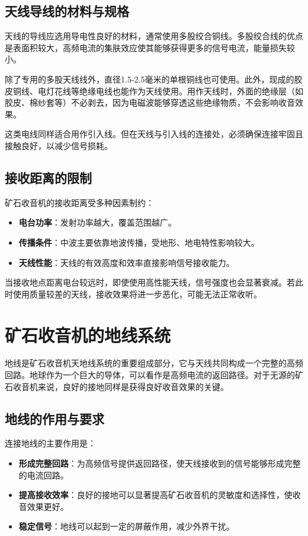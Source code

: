 \documentclass[12pt,UTF8]{ctexbook}
\begin{document}
\section{天线导线的材料与规格}

天线的导线应选用导电性良好的材料，通常使用多股绞合铜线。多股绞合线的优点是表面积较大，高频电流的集肤效应使其能够获得更多的信号电流，能量损失较小。

除了专用的多股天线线外，直径1.5-2.5毫米的单根铜线也可使用。此外，现成的胶皮铜线、电灯花线等绝缘电线也能作为天线使用。用作天线时，外面的绝缘层（如胶皮、棉纱套等）不必剥去，因为电磁波能够穿透这些绝缘物质，不会影响收音效果。

这类电线同样适合用作引入线。但在天线与引入线的连接处，必须确保连接牢固且接触良好，以减少信号损耗。

\section{接收距离的限制}

矿石收音机的接收距离受多种因素制约：
\begin{itemize}
	\item \textbf{电台功率}：发射功率越大，覆盖范围越广。
	\item \textbf{传播条件}：中波主要依靠地波传播，受地形、地电特性影响较大。
	\item \textbf{天线性能}：天线的有效高度和效率直接影响信号接收能力。
\end{itemize}

当接收地点距离电台较远时，即使使用高性能天线，信号强度也会显著衰减。若此时使用质量较差的天线，接收效果将进一步恶化，可能无法正常收听。

\chapter{矿石收音机的地线系统}

地线是矿石收音机天地线系统的重要组成部分，它与天线共同构成一个完整的高频回路。地球作为一个巨大的导体，可以看作是高频电流的返回路径。对于无源的矿石收音机来说，良好的接地同样是获得良好收音效果的关键。

\section{地线的作用与要求}

连接地线的主要作用是：
\begin{itemize}
	\item \textbf{形成完整回路}：为高频信号提供返回路径，使天线接收到的信号能够形成完整的电流回路。
	\item \textbf{提高接收效率}：良好的接地可以显著提高矿石收音机的灵敏度和选择性，使收音效果更好。
	\item \textbf{稳定信号}：地线可以起到一定的屏蔽作用，减少外界干扰。
\end{itemize}
\end{document}
